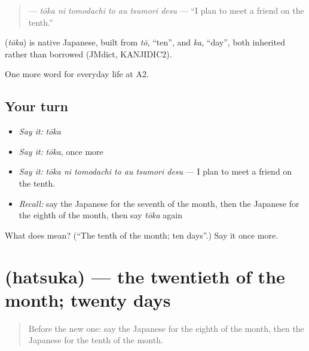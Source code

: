 \begin{quote}
\textbf{   } — \emph{tōka ni tomodachi to au tsumori desu} — \textquotedblleft{}I plan to meet a friend on the tenth.\textquotedblright{}
\end{quote}

\begin{cousinweb}
\textbf{} (\emph{tōka}) is native Japanese, built from \emph{tō}, \textquotedblleft{}ten\textquotedblright{}, and \emph{ka}, \textquotedblleft{}day\textquotedblright{}, both inherited rather than borrowed (JMdict, KANJIDIC2).
\end{cousinweb}

\begin{grammarlens}[title={What you've built}]
One more word for everyday life at A2.
\end{grammarlens}

\subsection*{Your turn}
\begin{itemize}
\raggedright
  \item \emph{Say it:} \emph{tōka}
  \item \emph{Say it:} \emph{tōka}, once more
  \item \emph{Say it:} \emph{tōka ni tomodachi to au tsumori desu} — I plan to meet a friend on the tenth.
  \item \emph{Recall:} say the Japanese for the seventh of the month, then the Japanese for the eighth of the month, then say \emph{tōka} again
\end{itemize}

\begin{tcolorbox}[breakable,colback=teal!4,colframe=teal!35!black,title={Before you move on}]
What does  mean? (\textquotedblleft{}The tenth of the month; ten days\textquotedblright{}.) Say it once more.
\end{tcolorbox}
\section[\texorpdfstring{\ja{はつか} (hatsuka)}{はつか (hatsuka)}]{ (hatsuka) — the twentieth of the month; twenty days}

\label{lesson:JA-C165-hatsuka}



\begin{quote}
Before the new one: say the Japanese for the eighth of the month, then the Japanese for the tenth of the month.
\end{quote}

